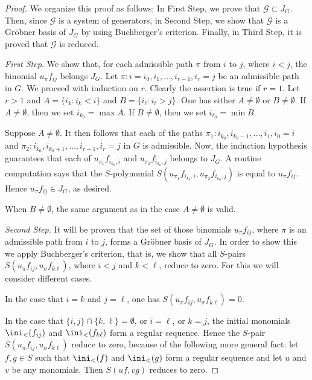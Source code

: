 \documentclass[11pt]{amsart}
\let\sect=\cap
\begin{document}
\begin{proof}
We organize this proof as follows:
In First Step, we prove that ${\mathcal G} \subset J_G$.
Then, since ${\mathcal G}$ is a system of generators,
in Second Step, we show that ${\mathcal G}$ is a Gr\"obner
basis of $J_G$ by using Buchberger's criterion.  Finally,
in Third Step, it is proved that ${\mathcal G}$ is reduced.

\medskip
\noindent
{\em First Step.}
We show that, for each admissible path $\pi$ from $i$ to $j$,
where $i < j$,
the binomial $u_\pi f_{ij}$ belongs $J_G$.
Let
$\pi: i=i_0,i_1,\ldots,i_{r-1},i_r=j$ be an admissible path in $G$.
We proceed with induction on $r$.
Clearly the assertion is true if $r = 1$.
Let $r > 1$ and
$A = \{ i_k : i_k < i \}$
and
$B = \{ i_\ell : i_\ell > j \}$.
One has either $A \neq \emptyset$ or $B \neq \emptyset$.
If $A \neq \emptyset$, then we set $i_{k_0} = \max A$.
If $B \neq \emptyset$, then we set $i_{\ell_0} = \min B$.

Suppose $A \neq \emptyset$.
It then follows that
each of the paths
$\pi_1 : i_{k_0}, i_{k_0-1}, \ldots, i_1, i_0=i$
and
$\pi_2 : i_{k_0}, i_{k_0+1}, \ldots, i_{r-1}, i_r = j$
in $G$ is admissible.
Now,
the induction hypothesis guarantees that
each of $u_{\pi_1}f_{i_{k_0},i}$ and
$u_{\pi_2}f_{i_{k_0},j}$ belongs to $J_G$.
A routine computation says that the $S$-polynomial
$S(u_{\pi_1}f_{i_{k_0},i}, u_{\pi_2}f_{i_{k_0},j})$
is equal to $u_\pi f_{ij}$.
Hence $u_\pi f_{ij} \in J_G$, as desired.

When $B \neq \emptyset$, the same argument as
in the case $A \neq \emptyset$ is valid.

\medskip
\noindent
{\em Second Step.}
It will be proven that the set of those
binomials $u_\pi f_{ij}$, where $\pi$ is an admissible path from $i$ to $j$,
forms a Gr\"obner basis of $J_G$.
In order to show this we apply Buchberger's criterion, that is,
we show that all $S$-pairs $S(u_\pi f_{ij}, u_\sigma f_{k\ell})$,
where $i < j$ and $k < \ell$,
reduce to zero. For this we will consider different cases.

In the case that $i=k$ and $j=\ell$, one has $S(u_\pi f_{ij}, u_\sigma f_{k\ell})=0$.

In the case that $\{i,j\}\sect\{k,\ell\}=\emptyset$, or $i=\ell$, or $k=j$, the initial monomials $\ini_<(f_{ij})$ and $\ini_<(f_{k\ell})$
form a regular sequence. Hence the $S$-pair $S(u_\pi f_{ij}, u_\sigma f_{k\ell})$ reduce to zero, because of the following more general fact: let $f,g\in S$ such that $\ini_<(f)$ and $\ini_<(g)$ form a regular sequence and let $u$ and $v$ be any monomials. Then $S(uf,vg)$ reduces to zero.


\end{proof}
\end{document}
